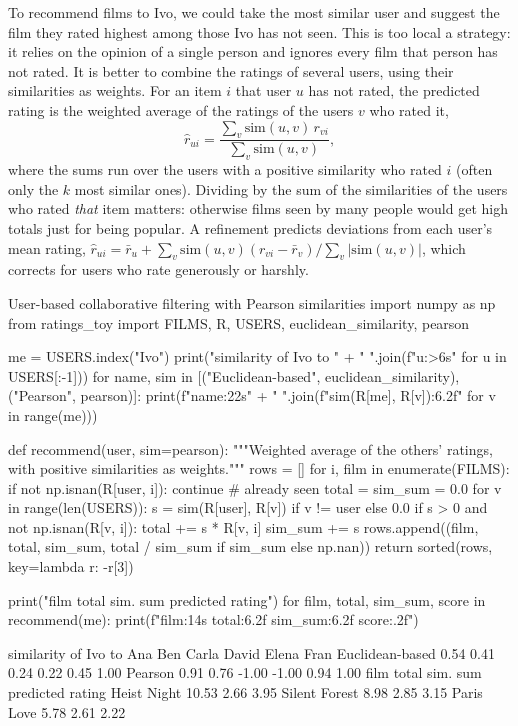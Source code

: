 To recommend films to Ivo, we could take the most similar user and suggest the film they rated highest among those Ivo
has not seen. This is too local a strategy: it relies on the opinion of a single person and ignores every film that
person has not rated. It is better to combine the ratings of several users, using their similarities as weights. For
an item $i$ that user $u$ has not rated, the predicted rating is the weighted average of the ratings of the users $v$ who
rated it,
\begin{equation}\label{eq:usercf}
  \hat r_{ui}=\frac{\sum_{v}\mathrm{sim}(u,v)\,r_{vi}}{\sum_{v}\mathrm{sim}(u,v)},
\end{equation}
where the sums run over the users with a positive similarity who rated $i$ (often only the $k$ most similar ones).
Dividing by the sum of the similarities of the users who rated \emph{that} item matters: otherwise films seen by many
people would get high totals just for being popular. A refinement predicts deviations from each user's mean rating,
$\hat r_{ui}=\bar r_u+\sum_v\mathrm{sim}(u,v)(r_{vi}-\bar r_v)/\sum_v|\mathrm{sim}(u,v)|$, which corrects for users who
rate generously or harshly.

\begin{pylisting}[label={lst:usercf}]{User-based collaborative filtering with Pearson similarities}
import numpy as np
from ratings_toy import FILMS, R, USERS, euclidean_similarity, pearson

me = USERS.index("Ivo")
print("similarity of Ivo to   " + "  ".join(f"{u:>6s}" for u in USERS[:-1]))
for name, sim in [("Euclidean-based", euclidean_similarity), ("Pearson", pearson)]:
    print(f"{name:22s}" + "  ".join(f"{sim(R[me], R[v]):6.2f}" for v in range(me)))

def recommend(user, sim=pearson):
    """Weighted average of the others' ratings, with positive similarities as weights."""
    rows = []
    for i, film in enumerate(FILMS):
        if not np.isnan(R[user, i]):
            continue                                   # already seen
        total = sim_sum = 0.0
        for v in range(len(USERS)):
            s = sim(R[user], R[v]) if v != user else 0.0
            if s > 0 and not np.isnan(R[v, i]):
                total += s * R[v, i]
                sim_sum += s
        rows.append((film, total, sim_sum, total / sim_sum if sim_sum else np.nan))
    return sorted(rows, key=lambda r: -r[3])

print("film            total   sim. sum   predicted rating")
for film, total, sim_sum, score in recommend(me):
    print(f"{film:14s} {total:6.2f}   {sim_sum:6.2f}       {score:.2f}")
\end{pylisting}
\begin{pyoutput}
similarity of Ivo to      Ana     Ben   Carla   David   Elena    Fran
Euclidean-based         0.54    0.41    0.24    0.22    0.45    1.00
Pearson                 0.91    0.76   -1.00   -1.00    0.94    1.00
film            total   sim. sum   predicted rating
Heist Night     10.53     2.66       3.95
Silent Forest    8.98     2.85       3.15
Paris Love       5.78     2.61       2.22
\end{pyoutput}

